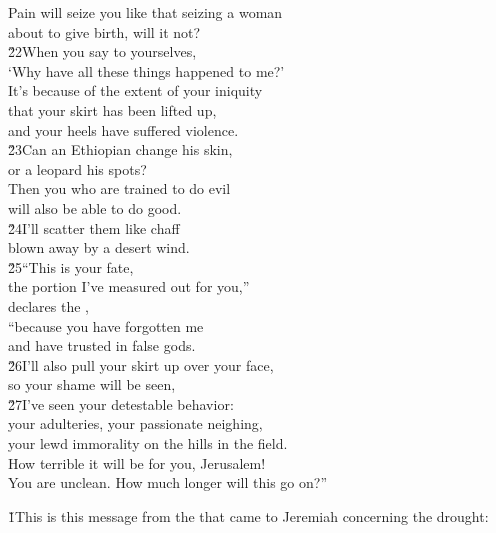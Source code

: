 \begin{poetry}
\poeml Pain will seize you like that seizing a woman \\
\poemll    about to give birth, will it not? \\
\poeml \v{22}When you say to yourselves, \\
\poemll    `Why have all these things happened to me?' \\
\poeml It's because of the extent of your iniquity \\
\poemll    that your skirt has been lifted up, \\
\poemlll       and your heels have suffered violence. \\
\poeml \v{23}Can an Ethiopian change his skin, \\
\poemll    or a leopard his spots? \\
\poeml Then you who are trained to do evil \\
\poemll    will also be able to do good. \\
\poeml \v{24}I'll scatter them like chaff \\
\poemll    blown away by a desert wind. \\
\poeml \v{25}``This is your fate, \\
\poemll    the portion I've measured out for you,'' \\
\poemlll       declares the , \\
\poeml ``because you have forgotten me \\
\poemll    and have trusted in false gods. \\
\poeml \v{26}I'll also pull your skirt up over your face, \\
\poemll    so your shame will be seen, \\
\poeml \v{27}I've seen your detestable behavior: \\
\poemll    your adulteries, your passionate neighing, \\
\poemlll       your lewd immorality on the hills in the field. \\
\poeml How terrible it will be for you, Jerusalem! \\
\poemll    You are unclean. How much longer will this go on?''
\end{poetry}

\v{1}This is this message from the  that came to Jeremiah concerning the drought:

